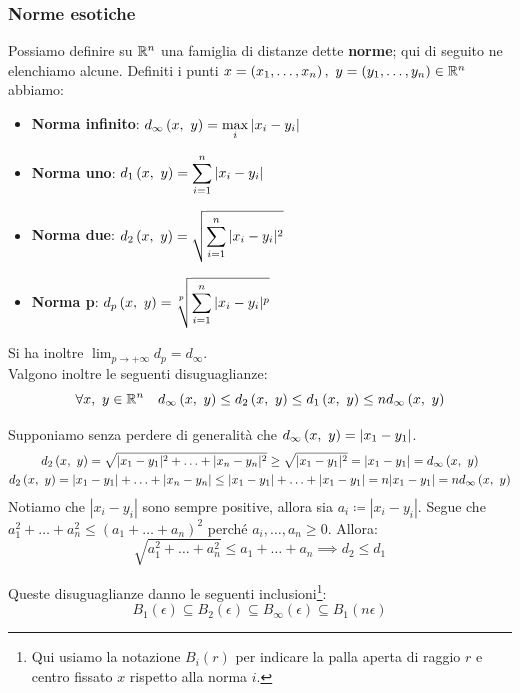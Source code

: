 \subsubsection{Norme esotiche}
Possiamo definire su $\mathbb{R}^n$ una famiglia di distanze dette \textbf{norme}; qui di seguito ne elenchiamo alcune. Definiti i punti $x=\left(x_1,\ldots, x_n\right),\ y=\left(y_1,\ldots, y_n\right)\in\realset^n$ abbiamo:
\begin{itemize}
\item \textbf{Norma infinito}: $\displaystyle d_\infty\left(x,\ y\right)=\max_{i}{|x_i-y_i|}$
\item \textbf{Norma uno}: $\displaystyle d_1\left(x,\ y\right)=\sum_{i=1}^{n}|x_i-y_i|$
\item \textbf{Norma due}: $\displaystyle d_2\left(x,\ y\right)=\sqrt{\sum_{i=1}^{n}|x_i-y_i|^2}$
\item \textbf{Norma p}: $\displaystyle\mvf{d_p}{x}{y}=\sqrt[\leftroot{1}\uproot{3}p]{\sum_{i=1}^{n}|x_i-y_i|^p}$
\end{itemize}
Si ha inoltre $\displaystyle \lim_{p \to +\infty}d_p=d_\infty$.\\
Valgono inoltre le seguenti disuguaglianze:
\begin{equation}
\forall x,\ y\in\mathbb{R}^n\quad d_\infty\left(x,\ y\right)\leq d_2\left(x,\ y\right)\leq d_1\left(x,\ y\right)\leq nd_\infty\left(x,\ y\right)
\end{equation}
\begin{demonstration}
Supponiamo senza perdere di generalità che $d_\infty\left(x,\ y\right)=|x_1-y_1|$.
\begin{gather*}
d_2\left(x,\ y\right)=\sqrt{|x_1-y_1|^2+\ldots+|x_n-y_n|^2}\geq\sqrt{|x_1-y_1|^2}=|x_1-y_1|=d_\infty\left(x,\ y\right)\\
d_2\left(x,\ y\right)=|x_1-y_1|+\ldots+|x_n-y_n|\leq|x_1-y_1|+\ldots+|x_1-y_1|=n|x_1-y_1|=nd_\infty\left(x,\ y\right)
\end{gather*}
Notiamo che $|x_i-y_i|$ sono sempre positive, allora sia $a_i\coloneqq|x_i-y_i|$. Segue che $a_1^2+\ldots+a_n^2\leq (a_1+\ldots+a_n)^2$ perché $a_i,\ldots,a_n\geq0$. Allora:
\begin{equation*}
\sqrt{a_1^2+\ldots+a_n^2}\leq a_1+\ldots+a_n\implies d_2\leq d_1
\end{equation*}
\end{demonstration}
Queste disuguaglianze danno le seguenti inclusioni\footnote{Qui usiamo la notazione $B_i\left(r\right)$ per indicare la palla aperta di raggio $r$ e centro fissato $x$ rispetto alla norma $i$.}:
\begin{equation}
B_1\left(\epsilon\right)\subseteq B_2\left(\epsilon\right)\subseteq B_\infty\left(\epsilon\right)\subseteq B_1\left(n\epsilon\right)
\end{equation}
